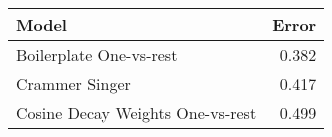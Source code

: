 \begin{tabular}{lr}
\toprule
                           Model &  Error \\
\midrule
        Boilerplate One-vs-rest  &  0.382 \\
                  Crammer Singer &  0.417 \\
Cosine Decay Weights One-vs-rest &  0.499 \\
\bottomrule
\end{tabular}
